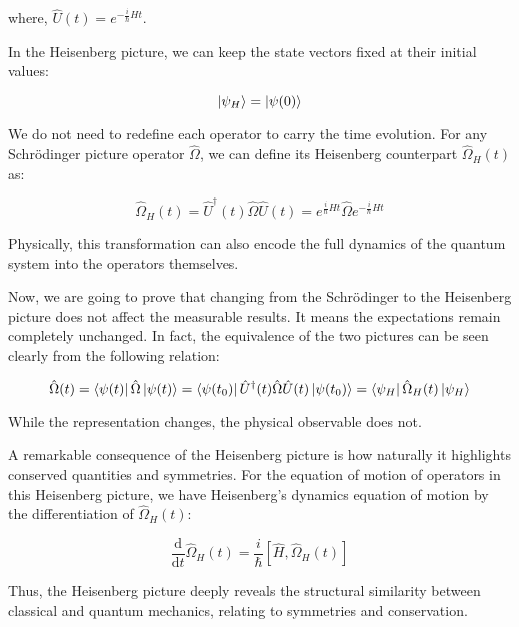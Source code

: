 where, $\hat{U}(t)=e^{-\frac{i}{\hbar}Ht}$.

In the Heisenberg picture, we can keep the state vectors fixed at their initial values:

\begin{equation}
    \ket{\psi_H}=\ket{\psi(0)}
    \label{Heisenberg_vec}
\end{equation}

We do not need to redefine each operator to carry the time evolution. For any Schrödinger picture operator $\hat{\Omega}$, we can define its Heisenberg counterpart $\hat{\Omega}_H(t)$ as:

\begin{equation}
    \hat\Omega_H(t)
    =\hat{U}^\dagger(t)\hat{\Omega}\hat{U}(t)
    =e^{\frac{i}{\hbar}Ht}\hat{\Omega}e^{-\frac{i}{\hbar}Ht}
    \label{Heisenberg_ope}
\end{equation}

Physically, this transformation can also encode the full dynamics of the quantum system into the operators themselves.

Now, we are going to prove that changing from the Schrödinger to the Heisenberg picture does not affect the measurable results.
It means the expectations remain completely unchanged.
In fact, the equivalence of the two pictures can be seen clearly from the following relation:

\begin{equation}
    \hat\Omega(t)
    =\bra{\psi(t)}\hat{\Omega}\ket{\psi(t)}
    =\bra{\psi(t_0)}\hat{U}^\dagger(t)\hat{\Omega}\hat{U}(t)\ket{\psi(t_0)}
    =\bra{\psi_H}\hat{\Omega}_H(t)\ket{\psi_H}
    \label{SH}
\end{equation}

While the representation changes, the physical observable does not. 

A remarkable consequence of the Heisenberg picture is how naturally it highlights conserved quantities and symmetries. For the equation of motion of operators in this Heisenberg picture, we have Heisenberg's dynamics equation of motion by the differentiation of $\hat{\Omega}_H(t)$:

\begin{equation}
    \frac{\mathrm{d}}{\mathrm{d}t}\hat{\Omega}_H(t)
    =\frac{i}{\hbar}\left[\hat{H},\hat{\Omega}_H(t)\right]
    \label{SD}
\end{equation}

Thus, the Heisenberg picture deeply reveals the structural similarity between classical and quantum mechanics, relating to symmetries and conservation.

